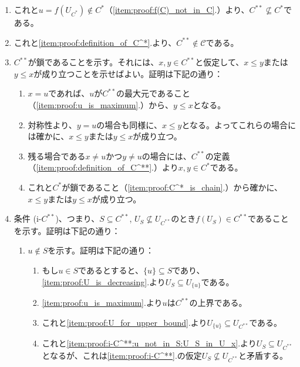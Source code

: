 ﻿\documentclass{ltjsarticle}
\theoremstyle{definition}
\begin{document}
\begin{enumerate}
    \item これと$u = f(U_{C^*}) \not\in C^*$（\ref{item:proof:f(C)_not_in_C}.）より、$C^{**} \not\subseteq C^*$である。
    \item \label{item:proof:C^**_not_in_C} これと\ref{item:proof:definition_of_C^*}.より、$C^{**} \not\in \mathcal{C}$である。
    \item \label{item:proof:C^**_is_chain} $C^{**}$が鎖であることを示す。それには、$x,y \in C^{**}$と仮定して、$x \leq y$または$y \leq x$が成り立つことを示せばよい。証明は下記の通り：
    \begin{enumerate}
        \item $x = u$であれば、$u$が$C^{**}$の最大元であること（\ref{item:proof:u_is_maximum}.）から、$y \leq x$となる。
        \item 対称性より、$y = u$の場合も同様に、$x \leq y$となる。よってこれらの場合には確かに、$x \leq y$または$y \leq x$が成り立つ。
        \item 残る場合である$x \neq u$かつ$y \neq u$の場合には、$C^{**}$の定義（\ref{item:proof:definition_of_C^**}.）より$x,y \in C^*$である。
        \item これと$C^*$が鎖であること（\ref{item:proof:C^*_is_chain}.）から確かに、$x \leq y$または$y \leq x$が成り立つ。
    \end{enumerate}
    \item \label{item:proof:i-C^**} 条件 (i-$C^{**}$)、つまり、$S \subseteq C^{**}$, $U_S \not\subseteq U_{C^{**}}$のとき$f(U_S) \in C^{**}$であることを示す。証明は下記の通り：
    \begin{enumerate}
        \item \label{item:proof:i-C^**:u_not_in_S} $u \not\in S$を示す。証明は下記の通り：
        \begin{enumerate}
            \item \label{item:proof:i-C^**:u_not_in_S:U_S_in_U_x} もし$u \in S$であるとすると、$\{u\} \subseteq S$であり、\ref{item:proof:U_is_decreasing}.より$U_S \subseteq U_{\{u\}}$である。
            \item \ref{item:proof:u_is_maximum}.より$u$は$C^{**}$の上界である。
            \item これと\ref{item:proof:U_for_upper_bound}.より$U_{\{u\}} \subseteq U_{C^{**}}$である。
            \item これと\ref{item:proof:i-C^**:u_not_in_S:U_S_in_U_x}.より$U_S \subseteq U_{C^{**}}$となるが、これは\ref{item:proof:i-C^**}.の仮定$U_S \not\subseteq U_{C^{**}}$と矛盾する。
        \end{enumerate}

\end{enumerate}
\end{enumerate}
\end{document}

